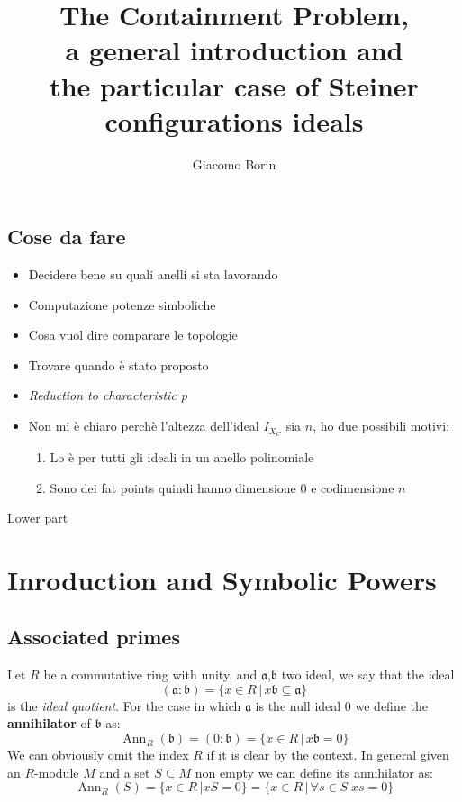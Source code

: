 \documentclass[]{book}
\title{The Containment Problem, 
\\a general introduction and 
\\the particular case of Steiner configurations ideals}
\author{Giacomo Borin}
\theoremstyle{plain}
\theoremstyle{remark}
\theoremstyle{definition}
\newcommand{\A}{\mathfrak{a}}
\newcommand{\B}{\mathfrak{b}}
\DeclareMathOperator{\Ann}{Ann}
\begin{document}
\frontmatter
\maketitle
\tableofcontents


\mainmatter

\section*{Cose da fare}
\begin{tcolorbox}[enhanced,title=My title,
  interior style={left color=red!20!white,
                  right color=yellow!50!white}]
\begin{itemize}
\item Decidere bene su quali anelli si sta lavorando
\item Computazione potenze simboliche 
\item Cosa vuol dire comparare le topologie
\item Trovare quando è stato proposto 
\item \textit{Reduction to characteristic p}
\item Non mi è chiaro perchè l'altezza dell'ideal $ I_{X_C} $ sia $ n $, ho due possibili motivi:
\begin{enumerate}
\item Lo è per tutti gli ideali in un anello polinomiale
\item Sono dei fat points quindi hanno dimensione 0 e codimensione $ n $
\end{enumerate}
\end{itemize}
\tcblower
Lower part
\end{tcolorbox}


\chapter{Inroduction and Symbolic Powers}


\section{Associated primes}

Let $ R $ be a commutative ring with unity, and $ \A $,$ \B $ two ideal, we say that the ideal
\begin{equation*}
	(\A : \B) = \{ x \in R \,|\, x\B \subseteq \A  \}
\end{equation*}
 \nocite{AMCD}
is the \textit{ideal quotient}. For the case in which $ \A $  is the null ideal $ 0 $ we define the \textbf{annihilator} of $ \B $ as:
\begin{equation*}
	\Ann_R(\B) = (0 : \B) = \{ x \in R \,|\, x\B = 0  \}
\end{equation*}
We can obviously omit the index $ R $ if it is clear by the context. In general given an $ R  $-module $ M $ and a set $ S \subseteq M $ non empty we can define its annihilator as:
\begin{equation*}
	\Ann_R (S) = \{ x \in R \,| xS = 0  \} = \{ x \in R \,|\, \forall s \in S \; xs = 0  \}
\end{equation*}
\end{document}
